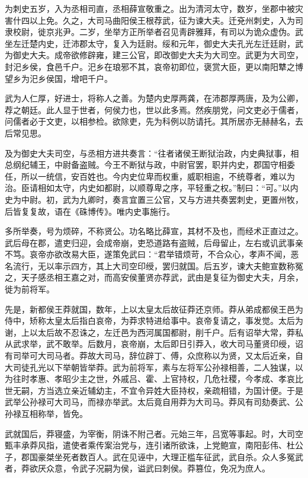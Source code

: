 \documentclass[12pt,UTF8]{ctexbook}
\begin{document}
为刺史五岁，入为丞相司直，丞相薛宣敬重之。出为清河太守，数岁，坐郡中被灾害什四以上免。久之，大司马曲阳侯王根荐武，征为谏大夫。迁兗州刺史，入为司隶校尉，徙京兆尹。二岁，坐举方正所举者召见靑辟雅拜，有司以为诡众虚伪。武坐左迁楚内史，迁沛郡太守，复入为廷尉。绥和元年，御史大夫孔光左迁廷尉，武为御史大夫。成帝欲修辟雍，建三公官，即改御史大夫为大司空。武更为大司空，封汜乡侯，食邑千户。汜乡在琅邪不其，哀帝初即位，褒赏大臣，更以南阳犨之博望乡为汜乡侯国，增吧千户。



武为人仁厚，好进士，将称人之善。为楚内史厚两龚，在沛郡厚两唐，及为公卿，荐之朝廷。此人显于世者，何侯力也，世以此多焉。然疾朋党，问文吏必于儒者，问儒者必于文吏，以相参检。欲除吏，先为科例以防请托。其所居亦无赫赫名，去后常见思。



及为御史大夫司空，与丞相方进共奏言：“往者诸侯王断狱治政，内史典狱事，相总纲纪辅王，中尉备盗贼。今王不断狱与政，中尉官罢，职并内史，郡国守相委任，所以一统信，安百姓也。今内史位卑而权重，威职相逾，不统尊者，难以为治。臣请相如太守，内史如都尉，以顺尊卑之序，平轻重之权。”制曰：“可。”以内史为中尉。初，武为九卿时，奏言宜置三公官，又与方进共奏罢刺史，更置州牧，后皆复复故，语在《硃博传》。唯内史事施行。



多所举奏，号为烦碎，不称贤公。功名略比薛宣，其材不及也，而经术正直过之。武后母在郡，遣吏归迎，会成帝崩，吏恐道路有盗贼，后母留止，左右或讥武事亲不笃。哀帝亦欲改易大臣，遂策免武曰：“君举错烦苛，不合众心，孝声不闻，恶名流行，无以率示四方，其上大司空印绶，罢归就国。后五岁，谏大夫鲍宣数称冤之，天子感丞相王嘉之对，而高安侯董贤亦荐武，武由是复征为御史大夫，月余，徙为前将军。



先是，新都侯王莽就国，数年，上以太皇太后故征莽还京师。莽从弟成都侯王邑为侍中，矫称太皇太后指白哀帝，为莽求特进给事中。哀帝复请之，事发觉。太后为谢，上以太后故不忍诛之，左迁邑为西河属国都尉，削千户。后有诏举大常，莽私从武求举，武不敢举。后数月，哀帝崩，太后即日引莽入，收大司马董贤印绶，诏有司举可大司马者。莽故大司马，辞位辟丁、傅，众庶称以为贤，又太后近亲，自大司徒孔光以下举朝皆举莽。武为前将军，素与左将军公孙禄相善，二人独谋，以为往时孝惠、孝昭少主之世，外戚吕、霍、上官持权，几危社稷，今孝成、孝哀比世无嗣，方当选立亲近辅幼主，不宜令异姓大臣持权，亲疏相错，为国计便。于是武举公孙禄可大司马，而禄亦举武。太后竟自用莽为大司马。莽风有司劾奏武、公孙禄互相称举，皆免。



武就国后，莽寝盛，为宰衡，阴诛不附己者。元始三年，吕宽等事起。时，大司空甄丰承莽风指，遣使者乘传案治党与，连引诸所欲诛，上党鲍宣，南阳彭伟、杜公子，郡国豪桀坐死者数百人。武在见诬中，大理正槛车征武，武自杀。众人多冤武者，莽欲厌众意，令武子况嗣为侯，谥武曰刺侯。莽篡位，免况为庶人。
\end{document}
